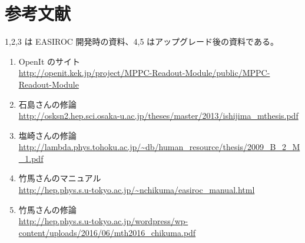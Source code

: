 \section{参考文献}
1,2,3 は EASIROC 開発時の資料、4,5 はアップグレード後の資料である。
\begin{enumerate}
\item OpenIt のサイト\\
\url{http://openit.kek.jp/project/MPPC-Readout-Module/public/MPPC-Readout-Module}
\item 石島さんの修論\\
\url{http://osksn2.hep.sci.osaka-u.ac.jp/theses/master/2013/ishijima_mthesis.pdf}
\item 塩崎さんの修論\\
\url{http://lambda.phys.tohoku.ac.jp/~db/human_resource/thesis/2009_B_2_M_1.pdf}
\item 竹馬さんのマニュアル\\
\url{http://hep.phys.s.u-tokyo.ac.jp/~nchikuma/easiroc_manual.html} 
\item 竹馬さんの修論\\
\url{http://hep.phys.s.u-tokyo.ac.jp/wordpress/wp-content/uploads/2016/06/mth2016_chikuma.pdf}
\end{enumerate}





